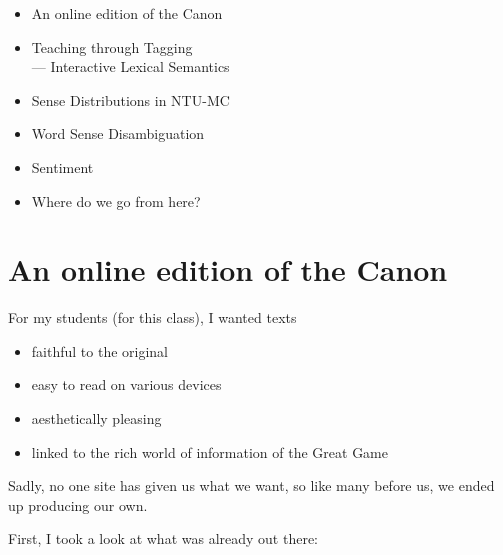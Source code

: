 \documentclass[a4paper,landscape,headrule,footrule,xetex]{foils}
\begin{document}
\renewcommand{\avmvalfont}{\it}
\maketitle


\begin{itemize}
\item An online edition of the Canon
\item Teaching through Tagging\\
--- Interactive Lexical Semantics
\item Sense Distributions in NTU-MC
\item Word Sense Disambiguation
\item Sentiment
\item Where do we go from here?
\end{itemize}


\section{An online edition of the Canon}


For my students (for this class), I wanted texts

\begin{itemize}
\item faithful to the original
\item easy to read on various devices
\item  aesthetically pleasing
\item linked to the rich world of information of the Great 
Game  
\end{itemize}

Sadly, no one site has given us what we want, so like many
before us, we ended up producing our own.  


First, I took a look at what was already out there:
\end{document}
